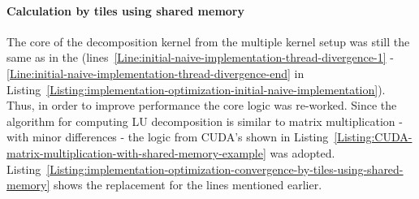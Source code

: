 \paragraph{Calculation by tiles using shared memory}\label{Paragraph:implementation-optimization-calculation-by-tiles-using-shared-memory}
The core of the decomposition kernel from the multiple kernel setup was still the same as in the \textit{} (lines~\ref{Line:initial-naive-implementation-thread-divergence-1} - \ref{Line:initial-naive-implementation-thread-divergence-end} in Listing~\ref{Listing:implementation-optimization-initial-naive-implementation}). Thus, in order to improve performance the core logic was re-worked. Since the algorithm for computing LU decomposition is similar to matrix multiplication - with minor differences - the logic from CUDA's \textit{} shown in Listing~\ref{Listing:CUDA-matrix-multiplication-with-shared-memory-example} was adopted. Listing~\ref{Listing:implementation-optimization-convergence-by-tiles-using-shared-memory} shows the replacement for the lines mentioned earlier.

